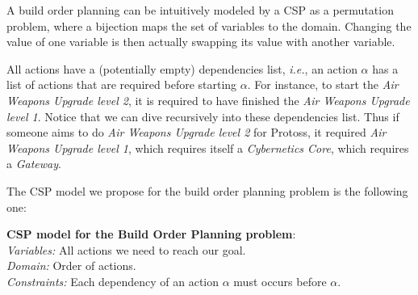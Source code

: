 \documentclass[journal]{IEEEtran}
\newcommand{\csp}{\textsc{CSP}\xspace}
\newcommand{\ie}{\textit{i.e.}}
\newcommand{\modelcsp}[4]%
{ \begin{trivlist}
  \item[]%
    \textbf{CSP model for #1}:\\
    \textit{Variables:} #2\\
    \textit{Domain:} #3\\
    \textit{Constraints:} #4
  \end{trivlist}%
}
\begin{document}
A  build order  planning can  be intuitively  modeled by  a \csp  as a
permutation problem,  where a bijection  maps the set of  variables to
the  domain. Changing  the  value  of one  variable  is then  actually
swapping its value with another variable.

All  actions have  a (potentially  empty) dependencies  list, \ie,  an
action  $\alpha$  has a  list  of  actions  that are  required  before
starting  $\alpha$.  For  instance, to  start the  \textit{Air Weapons
  Upgrade level  2}, it is  required to have finished  the \textit{Air
  Weapons Upgrade level  1}. Notice that we can  dive recursively into
these  dependencies  list. Thus  if  someone  aims to  do  \textit{Air
  Weapons  Upgrade  level  2}  for Protoss,  it  required  \textit{Air
  Weapons    Upgrade   level    1},    which    requires   itself    a
\textit{Cybernetics Core}, which requires a \textit{Gateway}.

The \csp model we propose for  the build order planning problem is the
following one:

\modelcsp{the Build Order Planning problem}%
{All actions we need to reach our goal.}%
{Order of actions.}%
{Each dependency of an action $\alpha$ must occurs before $\alpha$.}
\end{document}

